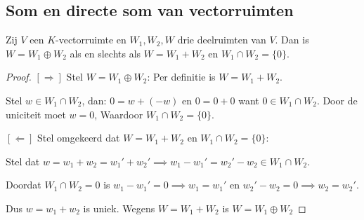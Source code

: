 \subsection{Som en directe som van vectorruimten}

\begin{lemma}[2.5.2]
    Zij $V$ een $K$-vectorruimte en $W_1, W_2, W$ drie deelruimten van $V$. Dan is $W = W_1 \oplus W_2$ als en slechts als $W = W_1 + W_2$ en $W_1 \cap W_2 = \{0\}$.
\end{lemma}
\begin{proof}
    \([\Rightarrow]\) Stel \(W =W_1 \oplus W_2\):
    Per definitie is \(W = W_1 + W_2\).

    Stel \(w \in W_1 \cap W_2\), dan:
    \(0 = w + (-w)\) en \(0 = 0 + 0\) want \(0 \in W_1 \cap W_2 \).
    Door de uniciteit moet \(w=0\),
    Waardoor  \(W_1 \cap W_2 = \{0\} \).

    \([\Leftarrow]\) Stel omgekeerd dat $W = W_1 + W_2$ en $W_1 \cap W_2 = \{0\}$:

    Stel dat \(w = w_1 + w_2 = w_1' + w_2' \implies w_1 - w_1' = w_2' - w_2 \in W_1 \cap W_2\).

    Doordat \( W_1 \cap W_2 = 0\) is \(w_1 - w_1' =0 \implies w_1 = w_1'\) en \( w_2' - w_2= 0 \implies w_2 = w_2'\).

    Dus \(w = w_1 + w_2\) is uniek.
    Wegens \(W = W_1 + W_2\) is \(W = W_1 \oplus W_2\)
\end{proof}

